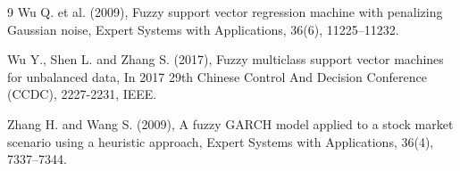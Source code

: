 \documentclass[twoside]{article}
\begin{document}
\begin{thebibliography}{9}
	Wu Q. et al. (2009), Fuzzy support vector regression machine with penalizing Gaussian noise, Expert Systems with Applications, 36(6), 11225–11232.
	
	Wu Y., Shen L. and Zhang S. (2017), Fuzzy multiclass support vector machines for unbalanced data, In 2017 29th Chinese Control And Decision Conference (CCDC), 2227-2231, IEEE.
	
	Zhang H. and Wang S. (2009), A fuzzy GARCH model applied to a stock market scenario using a heuristic approach, Expert Systems with Applications, 36(4), 7337–7344.
	
\end{thebibliography}
	
\end{document}
